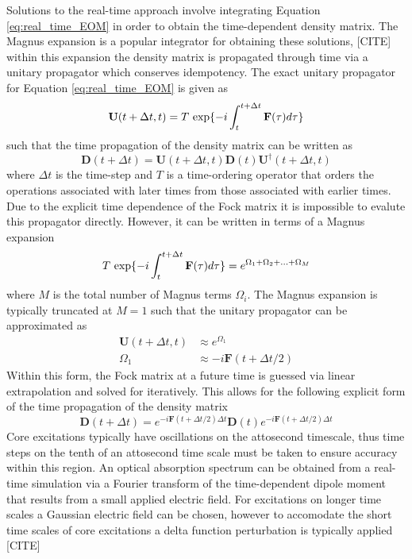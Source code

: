 \documentclass[final]{emory}
\begin{document}
Solutions to the real-time approach involve integrating Equation \ref{eq:real_time_EOM} in order to obtain the time-dependent density matrix.  The Magnus expansion is a popular integrator for obtaining these solutions, [CITE] within this expansion the density matrix is propagated through time via a unitary propagator which conserves idempotency. The exact unitary propagator for Equation \ref{eq:real_time_EOM} is given as
\begin{equation}
\mathbf{U}(t + \Delta t, t) = T \ {\rm exp}\{-i \int^{t+\Delta t}_t \mathbf{F}(\tau) d\tau\}
\end{equation}
such that the time propagation of the density matrix can be written as
\begin{equation}
\mathbf{D}(t + \Delta t) = \mathbf{U}(t + \Delta t, t) \mathbf{D}(t) \mathbf{U}^{\dagger}(t + \Delta t, t) 
\end{equation}
where $\Delta t$ is the time-step and $T$ is a time-ordering operator that orders the operations associated with later times from those associated with earlier times. Due to the explicit time dependence of the Fock matrix it is impossible to evalute this propagator directly. However, it can be written in terms of a Magnus expansion
\begin{equation}
 T \ {\rm exp}\{-i \int^{t+\Delta t}_t \mathbf{F}(\tau) d\tau\} = e^{\Omega_1 + \Omega_2 + ... +\Omega_M}
\end{equation}
where $M$ is the total number of Magnus terms $\Omega_i$. The Magnus expansion is typically truncated at $M=1$ such that the unitary propagator can be approximated as
\begin{align}
\mathbf{U}(t + \Delta t, t) &\approx e^{\Omega_1} \\
\Omega_1 &\approx -i\mathbf{F}(t + \Delta t/2)
\end{align}
Within this form, the Fock matrix at a future time is guessed via linear extrapolation and solved for iteratively. This allows for the following explicit form of the time propagation of the density matrix
\begin{equation}
\mathbf{D}(t + \Delta t) = e^{-i\mathbf{F}(t+\Delta t/2)\Delta t} \mathbf{D}(t) e^{-i\mathbf{F}(t+\Delta t/2)\Delta t} 
\end{equation}
Core excitations typically have oscillations on the attosecond timescale, thus time steps on the tenth of an attosecond time scale must be taken to ensure accuracy within this region. An optical absorption spectrum can be obtained from a real-time simulation via a Fourier transform of the time-dependent dipole moment that results from a small applied electric field. For excitations on longer time scales a Gaussian electric field can be chosen, however to accomodate the short time scales of core excitations a delta function perturbation is typically applied [CITE]
\end{document}
